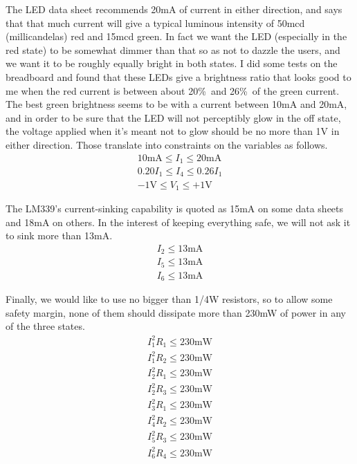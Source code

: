 The LED data sheet recommends 20mA of current in either direction, and says
that that much current will give a typical luminous intensity of 50mcd
(millicandelas) red and 15mcd green.  In fact we want the LED
(especially in the red state) to be somewhat dimmer than that so as not to
dazzle the users, and we want it to be roughly equally bright in both
states.  I did some tests on the breadboard and found that these LEDs give a
brightness ratio that looks good to me when the red current is between about
20\%\ and 26\%\ of the green current.  The best green brightness seems to be
with a current between 10mA and 20mA, and in order to be sure that the LED
will not perceptibly glow in the off state, the voltage applied when it's
meant not to glow should be no
more than 1V in either direction.  Those translate into constraints on the
variables as follows.
\begin{gather*}
  10\textrm{mA} \le I_1 \le 20\textrm{mA} \\
  0.20I_1 \le I_4 \le 0.26I_1 \\
  -1\textrm{V} \le V_1 \le +1\textrm{V}
\end{gather*}

The LM339's current-sinking capability is quoted as 15mA on some data sheets
and 18mA on others.  In the interest of keeping everything safe, we will not
ask it to sink more than 13mA.
\begin{gather*}
  I_2 \le 13\textrm{mA} \\
  I_5 \le 13\textrm{mA} \\
  I_6 \le 13\textrm{mA}
\end{gather*}

Finally, we would like to use no bigger than 1/4W resistors, so to allow
some safety margin, none of them should dissipate more than 230mW of power
in any of the three states.
\begin{gather*}
  I_1^2R_1 \le 230\textrm{mW} \\
  I_1^2R_2 \le 230\textrm{mW} \\
  I_2^2R_1 \le 230\textrm{mW} \\
  I_2^2R_3 \le 230\textrm{mW} \\
  I_3^2R_1 \le 230\textrm{mW} \\
  I_4^2R_2 \le 230\textrm{mW} \\
  I_5^2R_3 \le 230\textrm{mW} \\
  I_6^2R_4 \le 230\textrm{mW}
\end{gather*}


